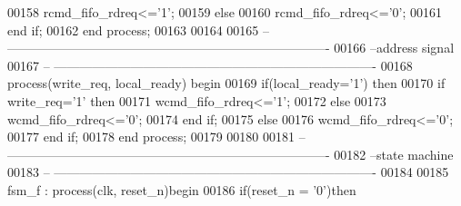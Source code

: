 \begin{DoxyCode}
00158             \textcolor{vhdlchar}{rcmd_fifo_rdreq}\textcolor{vhdlchar}{<=}\textcolor{vhdlchar}{'}\textcolor{vhdllogic}{}\textcolor{vhdllogic}{1}\textcolor{vhdlchar}{'};
00159         \textcolor{keywordflow}{else} 
00160             \textcolor{vhdlchar}{rcmd_fifo_rdreq}\textcolor{vhdlchar}{<=}\textcolor{vhdlchar}{'}\textcolor{vhdllogic}{}\textcolor{vhdllogic}{0}\textcolor{vhdlchar}{'};
00161         \textcolor{keywordflow}{end} \textcolor{keywordflow}{if};
00162 \textcolor{keywordflow}{end} \textcolor{keywordflow}{process};
00163 
00164 
00165 \textcolor{keyword}{-- ----------------------------------------------------------------------------}
00166 \textcolor{keyword}{--address signal}
00167 \textcolor{keyword}{-- ----------------------------------------------------------------------------}
00168 \textcolor{keywordflow}{process}(write_req, local_ready) \textcolor{keywordflow}{begin}
00169     \textcolor{keywordflow}{if}\textcolor{vhdlchar}{(}\textcolor{vhdlchar}{local_ready}\textcolor{vhdlchar}{=}\textcolor{vhdlchar}{'}\textcolor{vhdllogic}{}\textcolor{vhdllogic}{1}\textcolor{vhdlchar}{'}\textcolor{vhdlchar}{)} \textcolor{keywordflow}{then}
00170         \textcolor{keywordflow}{if} \textcolor{vhdlchar}{write_req}\textcolor{vhdlchar}{=}\textcolor{vhdlchar}{'}\textcolor{vhdllogic}{}\textcolor{vhdllogic}{1}\textcolor{vhdlchar}{'} \textcolor{keywordflow}{then} 
00171             \textcolor{vhdlchar}{wcmd_fifo_rdreq}\textcolor{vhdlchar}{<=}\textcolor{vhdlchar}{'}\textcolor{vhdllogic}{}\textcolor{vhdllogic}{1}\textcolor{vhdlchar}{'};
00172         \textcolor{keywordflow}{else} 
00173             \textcolor{vhdlchar}{wcmd_fifo_rdreq}\textcolor{vhdlchar}{<=}\textcolor{vhdlchar}{'}\textcolor{vhdllogic}{}\textcolor{vhdllogic}{0}\textcolor{vhdlchar}{'};
00174         \textcolor{keywordflow}{end} \textcolor{keywordflow}{if};
00175     \textcolor{keywordflow}{else}
00176         \textcolor{vhdlchar}{wcmd_fifo_rdreq}\textcolor{vhdlchar}{<=}\textcolor{vhdlchar}{'}\textcolor{vhdllogic}{}\textcolor{vhdllogic}{0}\textcolor{vhdlchar}{'};
00177     \textcolor{keywordflow}{end} \textcolor{keywordflow}{if};
00178 \textcolor{keywordflow}{end} \textcolor{keywordflow}{process};
00179 
00180 
00181 \textcolor{keyword}{-- ----------------------------------------------------------------------------}
00182 \textcolor{keyword}{--state machine}
00183 \textcolor{keyword}{-- ----------------------------------------------------------------------------}
00184 
00185 fsm\_f : \textcolor{keywordflow}{process}(clk, reset_n)\textcolor{keywordflow}{begin}
00186     \textcolor{keywordflow}{if}\textcolor{vhdlchar}{(}\textcolor{vhdlchar}{reset_n} \textcolor{vhdlchar}{=} \textcolor{vhdlchar}{'}\textcolor{vhdllogic}{}\textcolor{vhdllogic}{0}\textcolor{vhdlchar}{'}\textcolor{vhdlchar}{)}\textcolor{keywordflow}{then}

\end{DoxyCode}
